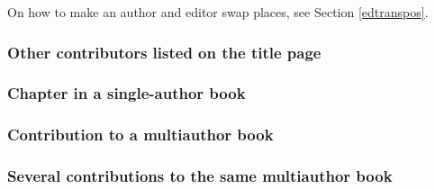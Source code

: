 \documentclass[11pt,letterpaper,oneside]{article}
\begin{document}
On how to make an author and editor swap places, see Section
\ref{edtranspos}.

\begin{citebib}
\item \cite{bonnefoy1995}
\item \cite{menchu1999}
\item \cite{adorno1999}
\item \cite{pound1953}
\end{citebib}

\subsubsection{Other contributors listed on the title page}
\label{14.105}

\begin{citebib}
\item \cite{chaucer1966}
\item \cite{cullen1961}
\item \cite{hayek1994}
\item \cite{prather1998}
\item \cite{williams1990}
\end{citebib}

\subsubsection{Chapter in a single-author book}

\begin{citebib}
\item \cite[211]{brower2015.8}
\item \cite{samples2006.7}
\item \cite[30-31]{samples2006.7}
\end{citebib}

\subsubsection{Contribution to a multiauthor book}

\begin{citebib}
\item \cite[325]{miller2014}
\item \cite{ellet1968}
\end{citebib}

\subsubsection{Several contributions to the same multiauthor book}
\label{14.108}
\end{document}
